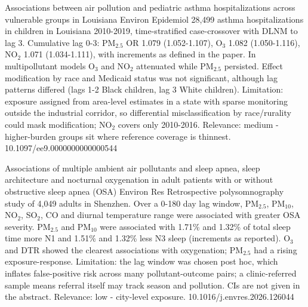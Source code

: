 \documentclass[10pt]{article}
\begin{document}
\par{}\baselineskip{}\baselineskip
{}

{Associations between air pollution and pediatric asthma hospitalizations across vulnerable groups in Louisiana}
{Environ Epidemiol}
{28,499 asthma hospitalizations in children in Louisiana 2010-2019, time-stratified case-crossover with DLNM to lag 3. Cumulative lag 0-3: PM$_{2.5}$ OR 1.079 (1.052-1.107), O$_3$ 1.082 (1.050-1.116), NO$_2$ 1.071 (1.034-1.111), with increments as defined in the paper. In multipollutant models O$_3$ and NO$_2$ attenuated while PM$_{2.5}$ persisted. Effect modification by race and Medicaid status was not significant, although lag patterns differed (lags 1-2 Black children, lag 3 White children). Limitation: exposure assigned from area-level estimates in a state with sparse monitoring outside the industrial corridor, so differential misclassification by race/rurality could mask modification; NO$_2$ covers only 2010-2016. Relevance: medium - higher-burden groups sit where reference coverage is thinnest.}
{10.1097/ee9.0000000000000544}

{Associations of multiple ambient air pollutants and sleep apnea, sleep architecture and nocturnal oxygenation in adult patients with or without obstructive sleep apnea (OSA)}
{Environ Res}
{Retrospective polysomnography study of 4,049 adults in Shenzhen. Over a 0-180 day lag window, PM$_{2.5}$, PM$_{10}$, NO$_2$, SO$_2$, CO and diurnal temperature range were associated with greater OSA severity. PM$_{2.5}$ and PM$_{10}$ were associated with 1.71\% and 1.32\% of total sleep time more N1 and 1.51\% and 1.32\% less N3 sleep (increments as reported). O$_3$ and DTR showed the clearest associations with oxygenation; PM$_{2.5}$ had a rising exposure-response. Limitation: the lag window was chosen post hoc, which inflates false-positive risk across many pollutant-outcome pairs; a clinic-referred sample means referral itself may track season and pollution. CIs are not given in the abstract. Relevance: low - city-level exposure.}
{10.1016/j.envres.2026.126044}
\end{document}
